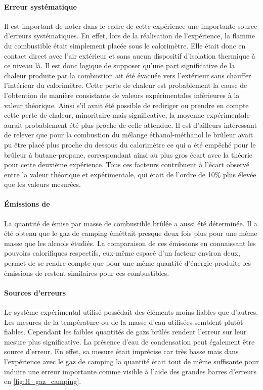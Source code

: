 \paragraph*{Erreur systématique}
Il est important de noter dans le cadre de cette expérience une importante source d'erreurs systématiques. En effet, lors de la réalisation de l'expérience, la flamme du combustible était simplement placée sous le calorimètre. Elle était donc en contact direct avec l'air extérieur et sans aucun dispositif d'isolation thermique à ce niveau là. Il est donc logique de supposer qu'une part significative de la chaleur produite par la combustion ait été évacuée vers l'extérieur sans chauffer l'intérieur du calorimètre. Cette perte de chaleur est probablement la cause de l'obtention de manière consistante de valeurs expérimentales inférieures à la valeur théorique. Ainsi s'il avait été possible de rediriger ou prendre en compte cette perte de chaleur, minoritaire mais significative, la moyenne expérimentale aurait probablement été plus proche de celle attendue. Il est d'ailleurs intéressant de relever que pour la combustion du mélange éthanol-méthanol le brûleur avait pu être placé plus proche du dessous du calorimètre ce qui a été empêché pour le brûleur à butane-propane, correspondant ainsi au plus gros écart avec la théorie pour cette deuxième expérience. Tous ces facteurs contribuent à l'écart observé entre la valeur théorique et expérimentale, qui était de l'ordre de 10\% plus élevée que les valeurs mesurées.


\paragraph*{Émissions de }
La quantité de  émise par masse de combustible brûlée a aussi été déterminée. Il a été obtenu que le gaz de camping éméttait presque deux fois plus pour une même masse que les alcools étudiés. La comparaison de ces émissions en connaissant les pouvoirs calorifiques respectifs, eux-même espacé d'un facteur environ deux, permet de se rendre compte que pour une même quantité d'énergie produite les émissions de  restent similaires pour ces combustibles. 

\paragraph*{Sources d'erreurs}
Le système expérimental utilisé possédait des éléments moins fiables que d'autres. Les mesures de la température ou de la masse d'eau utilisées semblent plutôt fiables. Cependant les faibles quantités de gazs brûlés rendent l'erreur sur leur mesure plus significative. La présence d'eau de condensation peut également être source d'erreur. En effet, sa mesure était imprécise car très basse mais dans l'expérience avec le gaz de camping la quantité était tout de même suffisante pour induire une erreur importante comme visible à l'aide des grandes barres d'erreurs en \autoref{fig:H_gaz_camping}.
